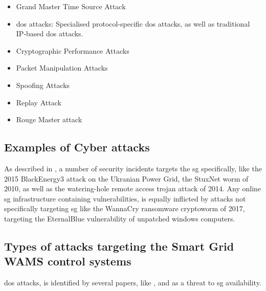 \begin{itemize}
    \item Grand Master Time Source Attack
    \item \acrfull{dos} attacks: Specialised protocol-specific \acrshort{dos} attacks, as well as traditional IP-based \acrshort{dos} attacks.
    \item Cryptographic Performance Attacks
    \item Packet Manipulation Attacks
    \item Spoofing Attacks
    \item Replay Attack   
    \item Rouge Master attack 
\end{itemize}



\subsection{Examples of Cyber attacks}
As described in \cite{sundararajan2019survey}, a number of security incidents targets the \acrshort{sg} specifically, like the 2015 BlackEnergy3 attack on the Ukranian  Power Grid, the StuxNet worm of 2010, as well as the watering-hole remote access trojan attack of 2014. 
Any online \acrshort{sg} infrastructure containing vulnerabilities, is equally inflicted by attacks not specifically targeting \acrfull{sg} like the WannaCry ransomware cryptoworm of 2017, targeting the EternalBlue vulnerability of unpatched windows computers.\\ 



\subsection{Types of attacks targeting the Smart Grid WAMS control systems}


\acrfull{dos} attacks, is identified by several papers, like  \cite{sundararajan2019survey}, \cite{Asri_Pranggono_2015} and \cite{gupta2017survey} as  a threat to \acrshort{sg} availability. \\ 








